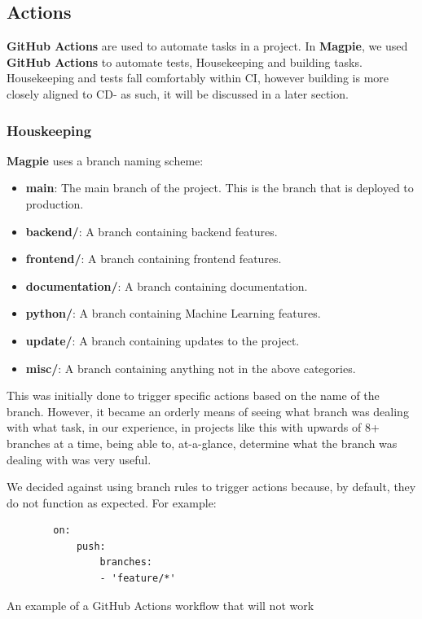 \newpage{}

\subsection{Actions}
\textbf{GitHub Actions} are used to automate tasks in a project. In
\textbf{Magpie}, we used \textbf{GitHub Actions} to automate tests, Housekeeping
and building tasks. Housekeeping and tests fall comfortably within CI, however
building is more closely aligned to CD- as such, it will be discussed in a later
section.

\subsubsection{Houskeeping}
\textbf{Magpie} uses a branch naming scheme:
\begin{itemize}
    \item \textbf{main}: The main branch of the project. This is the branch that
        is deployed to production.
    \item \textbf{backend/}: A branch containing backend features.
    \item \textbf{frontend/}: A branch containing frontend features.
    \item \textbf{documentation/}: A branch containing documentation.
    \item \textbf{python/}: A branch containing Machine Learning features.
    \item \textbf{update/}: A branch containing updates to the project.
    \item \textbf{misc/}: A branch containing anything not in the above categories.
\end{itemize}
This was initially done to trigger specific actions based on the name of the
branch. However, it became an orderly means of seeing what branch was dealing with
what task, in our experience, in projects like this with upwards of 8+ branches
at a time, being able to, at-a-glance, determine what the branch was dealing
with was very useful.

We decided against using branch rules to trigger actions because, by default,
they do not function as expected. For example:

\begin{listing}[htbp]
    \centering{}
    \begin{minipage}{0.85\textwidth}
    \begin{verbatim}
        on:
            push:
                branches:
                - 'feature/*'
    \end{verbatim}
    \end{minipage}
    \caption{An example of a GitHub Actions workflow that will not work}
\end{listing}

